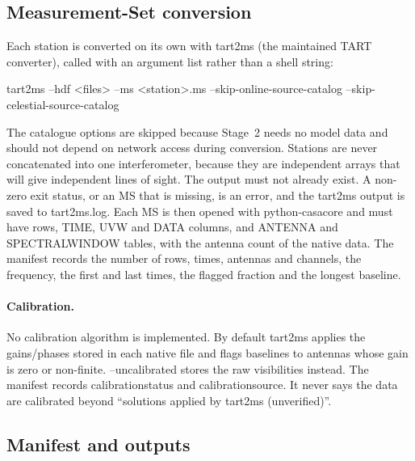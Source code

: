 \documentclass[11pt,a4paper]{article}
\newcommand{\code}[1]{{\ttfamily\def\_{\textunderscore\allowbreak}#1}}
\begin{document}
\subsection{Measurement-Set conversion}

Each station is converted on its own with \code{tart2ms} \cite{tart2ms} (the maintained
TART converter), called with an argument list rather than a shell string:
\begin{center}
\code{tart2ms --hdf <files> --ms <station>.ms --skip-online-source-catalog
--skip-celestial-source-catalog}
\end{center}
The catalogue options are skipped because Stage~2 needs no model data and
should not depend on network access during conversion. Stations are never
concatenated into one interferometer, because they are independent arrays
that will give independent lines of sight. The output must not already
exist. A non-zero exit status, or an MS that is missing, is an error, and
the \code{tart2ms} output is saved to \code{tart2ms.log}. Each MS is then
opened with python-casacore and must have rows, \code{TIME}, \code{UVW} and
\code{DATA} columns, and \code{ANTENNA} and \code{SPECTRAL\_WINDOW} tables,
with the antenna count of the native data. The manifest records the number
of rows, times, antennas and channels, the frequency, the first and last
times, the flagged fraction and the longest baseline.

\paragraph{Calibration.} No calibration algorithm is implemented. By
default \code{tart2ms} applies the \code{gains}/\code{phases} stored in each
native file and flags baselines to antennas whose gain is zero or
non-finite. \code{--uncalibrated} stores the raw visibilities instead. The
manifest records \code{calibration\_status} and \code{calibration\_source}.
It never says the data are calibrated beyond ``solutions applied by
\code{tart2ms} (unverified)''.

\subsection{Manifest and outputs}
\end{document}
